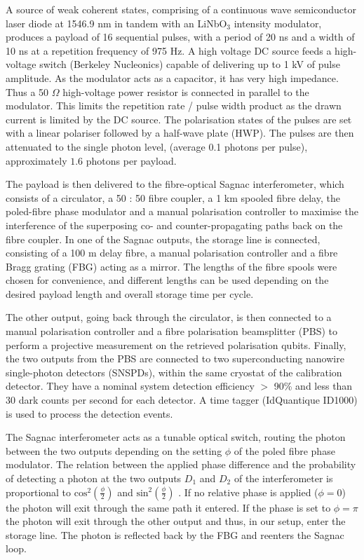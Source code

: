 \documentclass[%
reprint,
superscriptaddress,
 amsmath,amssymb,
 aps,
 prx,
floatfix,
]{revtex4-2}
\begin{document}
A source of weak coherent states, comprising of a continuous wave semiconductor laser diode at 1546.9 nm in tandem with an LiNbO$_3$ intensity modulator, produces a payload of 16 sequential pulses, with a period of 20 ns and a width of 10 ns at a repetition frequency of 975 Hz. A high voltage DC source feeds a high-voltage switch (Berkeley Nucleonics) capable of delivering up to 1 kV of pulse amplitude. As the modulator acts as a capacitor, it has very high impedance. Thus a 50 $\Omega$ high-voltage power resistor is connected in parallel to the modulator. This limits the repetition rate / pulse width product as the drawn current is limited by the DC source. The polarisation states of the pulses are set with a linear polariser followed by a half-wave plate (HWP). The pulses are then attenuated to the single photon level, (average 0.1 photons per pulse), approximately $1.6$ photons per payload.

The payload is then delivered to the fibre-optical Sagnac interferometer, which consists of a circulator, a 50 : 50 fibre coupler, a 1 km spooled fibre delay, the poled-fibre phase modulator and a manual polarisation controller to maximise the interference of the superposing co- and counter-propagating paths back on the fibre coupler. In one of the Sagnac outputs, the storage line is connected, consisting of a 100 m delay fibre, a manual polarisation controller and a fibre Bragg grating (FBG) acting as a mirror. The lengths of the fibre spools were chosen for convenience, and different lengths can be used depending on the desired payload length and overall storage time per cycle.

The other output, going back through the circulator, is then connected to a manual polarisation controller and a fibre polarisation beamsplitter (PBS) to perform a projective measurement on the retrieved polarisation qubits. Finally, the two outputs from the PBS are connected to two superconducting nanowire single-photon detectors (SNSPDs), within the same cryostat of the calibration detector. They have a nominal system detection efficiency $>$ 90\% and less than 30 dark counts per second for each detector. A time tagger (IdQuantique ID1000) is used to process the detection events. 

The Sagnac interferometer acts as a tunable optical switch, routing the photon between the two outputs depending on the setting $\phi$ of the poled fibre phase modulator. The relation between the applied phase difference and the probability of detecting a photon at the two outputs $D_1$ and $D_2$ of the interferometer is proportional to  $\textrm{cos}^2\left(\frac{\phi}{2}\right)$ and $\textrm{sin}^2\left(\frac{\phi}{2}\right)$ \cite{Alarcon2023}. If no relative phase is applied ($\phi=0$) the photon will exit through the same path it entered. If the phase is set to $\phi=\pi$ the photon will exit through the other output and thus, in our setup, enter the storage line. The photon is reflected back by the FBG and reenters the Sagnac loop. 
\end{document}

